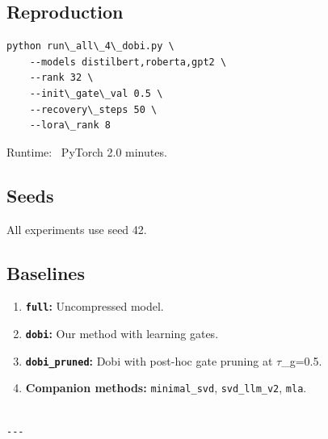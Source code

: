 \subsection{Reproduction}

\begin{lstlisting}
python run\_all\_4\_dobi.py \
    --models distilbert,roberta,gpt2 \
    --rank 32 \
    --init\_gate\_val 0.5 \
    --recovery\_steps 50 \
    --lora\_rank 8
\end{lstlisting}

Runtime: ~PyTorch 2.0 minutes.

\subsection{Seeds}

All experiments use seed 42.

\subsection{Baselines}

\begin{enumerate}
\item \textbf{\texttt{full}:} Uncompressed model.
\item \textbf{\texttt{dobi}:} Our method with learning gates.
\item \textbf{\texttt{dobi\_pruned}:} Dobi with post-hoc gate pruning at $\tau$\_g=0.5.
\item \textbf{Companion methods:} \texttt{minimal\_svd}, \texttt{svd\_llm\_v2}, \texttt{mla}.
\end{enumerate}
\begin{lstlisting}

---
\end{lstlisting}